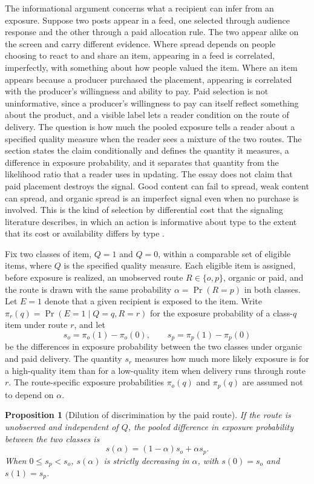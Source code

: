 \documentclass[11pt]{article}
\newtheorem{proposition}{Proposition}
\theoremstyle{definition}
\begin{document}
The informational argument concerns what a recipient can infer from an exposure. Suppose two posts appear in a feed, one selected through audience response and the other through a paid allocation rule. The two appear alike on the screen and carry different evidence. Where spread depends on people choosing to react to and share an item, appearing in a feed is correlated, imperfectly, with something about how people valued the item. Where an item appears because a producer purchased the placement, appearing is correlated with the producer's willingness and ability to pay. Paid selection is not uninformative, since a producer's willingness to pay can itself reflect something about the product, and a visible label lets a reader condition on the route of delivery. The question is how much the pooled exposure tells a reader about a specified quality measure when the reader sees a mixture of the two routes. The section states the claim conditionally and defines the quantity it measures, a difference in exposure probability, and it separates that quantity from the likelihood ratio that a reader uses in updating. The essay does not claim that paid placement destroys the signal. Good content can fail to spread, weak content can spread, and organic spread is an imperfect signal even when no purchase is involved. This is the kind of selection by differential cost that the signaling literature describes, in which an action is informative about type to the extent that its cost or availability differs by type \cite{spence1973}.

Fix two classes of item, $Q=1$ and $Q=0$, within a comparable set of eligible items, where $Q$ is the specified quality measure. Each eligible item is assigned, before exposure is realized, an unobserved route $R\in\{o,p\}$, organic or paid, and the route is drawn with the same probability $\alpha=\Pr(R=p)$ in both classes. Let $E=1$ denote that a given recipient is exposed to the item. Write $\pi_r(q)=\Pr(E=1\mid Q=q,R=r)$ for the exposure probability of a class-$q$ item under route $r$, and let
\[
s_o=\pi_o(1)-\pi_o(0),\qquad s_p=\pi_p(1)-\pi_p(0)
\]
be the differences in exposure probability between the two classes under organic and paid delivery. The quantity $s_r$ measures how much more likely exposure is for a high-quality item than for a low-quality item when delivery runs through route $r$. The route-specific exposure probabilities $\pi_o(q)$ and $\pi_p(q)$ are assumed not to depend on $\alpha$.

\begin{proposition}[Dilution of discrimination by the paid route]\label{prop:signal}
If the route is unobserved and independent of $Q$, the pooled difference in exposure probability between the two classes is
\[
s(\alpha)=(1-\alpha)s_o+\alpha s_p.
\]
When $0\le s_p<s_o$, $s(\alpha)$ is strictly decreasing in $\alpha$, with $s(0)=s_o$ and $s(1)=s_p$.
\end{proposition}
\end{document}
